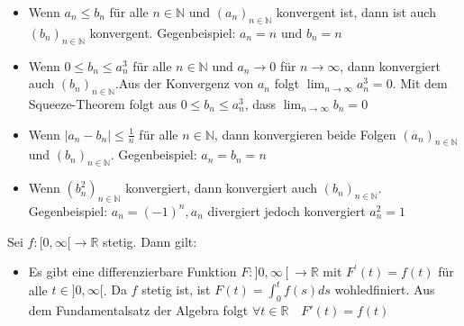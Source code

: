 \documentclass[7pt,landscape, margin = 0.1mm]{article}
\begin{document}
\begin{multicols}{4}
\begin{flushleft}
\begin{flushleft}
\begin{itemize}
\item[\textcolor{red}{W}]Wenn $a_n \leq b_n$ für alle $n \in \mathbb{N}$ und $\left(a_n\right)_{n \in \mathbb{N}}$ konvergent ist, dann ist auch $\left(b_n\right)_{n \in \mathbb{N}}$ konvergent. \textcolor{Emerald}{Gegenbeispiel: $a_n = n$ und $b_n=n$}

\item[\textcolor{green}{C}]Wenn $0 \leq b_n \leq a_n^3$ für alle $n \in \mathbb{N}$ und $a_n \rightarrow 0$ für $n \rightarrow \infty$, dann konvergiert auch $\left(b_n\right)_{n \in \mathbb{N}}$.\textcolor{Emerald}{Aus der Konvergenz von $a_n$ folgt $\lim_{n \to \infty} a_n^3 = 0 $. Mit dem Squeeze-Theorem folgt aus $0 \leq b_n \leq a_n^3$, dass $\lim_{n \to \infty} b_n = 0$}

\item[\textcolor{red}{W}]Wenn $\left|a_n-b_n\right| \leq \frac{1}{n}$ für alle $n \in \mathbb{N}$, dann konvergieren beide Folgen $\left(a_n\right)_{n \in \mathbb{N}}$ und $\left(b_n\right)_{n \in \mathbb{N}}$. \textcolor{Emerald}{Gegenbeispiel: $a_n=b_n=n$} 

\item[\textcolor{red}{W}]Wenn $\left(b_n^2\right)_{n \in \mathbb{N}}$ konvergiert, dann konvergiert auch $\left(b_n\right)_{n \in \mathbb{N}}$. \textcolor{Emerald}{Gegenbeispiel: $a_n=(-1)^n, a_n$ divergiert jedoch konvergiert $a_n^2 = 1$ } 
\end{itemize}
\vspace{1mm} \hline \vspace{1mm}



Sei $f:[0, \infty[\rightarrow \mathbb{R}$ stetig. Dann gilt:
\begin{itemize}

\item[\textcolor{green}{C}] Es gibt eine differenzierbare Funktion $F:] 0, \infty\left[\rightarrow \mathbb{R}\right.$ mit $F^{\prime}(t)=f(t)$ für alle $t \in] 0, \infty[$. \textcolor{Emerald}{Da $f$ stetig ist, ist $F(t) = \int_{0}^{t} f(s)ds$ wohledfiniert. Aus dem Fundamentalsatz der Algebra  folgt $  \forall t \in \mathbb{R}  \quad F'(t) = f(t) $}


\end{itemize}
\end{flushleft}
\end{flushleft}
\end{multicols}
\end{document}
